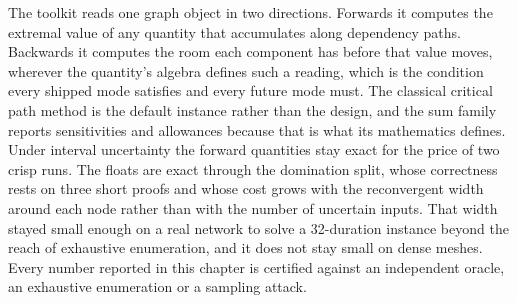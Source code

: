 \documentclass[12pt]{report}
\begin{document}
The toolkit reads one graph object in two directions. Forwards it computes
the extremal value of any quantity that accumulates along dependency paths.
Backwards it computes the room each component has before that value moves,
wherever the quantity's algebra defines such a reading, which is the
condition every shipped mode satisfies and every future mode must. The
classical critical path method is the default instance rather than the
design, and the sum family reports sensitivities and allowances because
that is what its mathematics defines. Under interval uncertainty the
forward quantities stay exact for the price of two crisp runs. The floats
are exact through the domination split, whose correctness rests on three
short proofs and whose cost grows with the reconvergent width around each
node rather than with the number of uncertain inputs. That width stayed
small enough on a real network to solve a 32-duration instance beyond the
reach of exhaustive enumeration, and it does not stay small on dense
meshes. Every number reported in this chapter is certified
against an independent oracle, an exhaustive enumeration or a sampling
attack.

\ifdefined\maindoc
\else
\printbibliography
\end{document}
